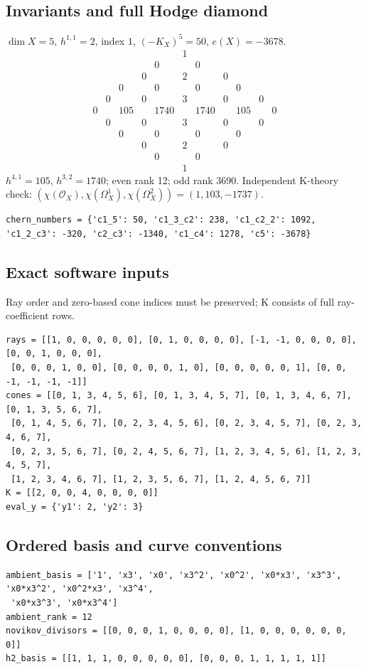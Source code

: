 \documentclass[10pt,a4paper]{article}
\begin{document}
\subsection*{Invariants and full Hodge diamond}
$\dim X=5$, $h^{1,1}=2$, index $1$, $(-K_X)^5=50$, $e(X)=-3678$.
\[\begin{array}{ccccccccccc}&&&&&1&&&&&\\&&&&0&&0&&&&\\&&&0&&2&&0&&&\\&&0&&0&&0&&0&&\\&0&&0&&3&&0&&0&\\0&&105&&1740&&1740&&105&&0\\&0&&0&&3&&0&&0&\\&&0&&0&&0&&0&&\\&&&0&&2&&0&&&\\&&&&0&&0&&&&\\&&&&&1&&&&&\end{array}\]
$h^{4,1}=105$, $h^{3,2}=1740$; even rank 12; odd rank 3690.
Independent K-theory check: $(\chi(\mathcal O_X),\chi(\Omega_X^1),\chi(\Omega_X^2))=(1, 103, -1737)$.
\begin{lstlisting}
chern_numbers = {'c1_5': 50, 'c1_3_c2': 238, 'c1_c2_2': 1092, 'c1_2_c3': -320, 'c2_c3': -1340, 'c1_c4': 1278, 'c5': -3678}
\end{lstlisting}
\subsection*{Exact software inputs}
Ray order and zero-based cone indices must be preserved; K consists of full ray-coefficient rows.
\begin{lstlisting}
rays = [[1, 0, 0, 0, 0, 0], [0, 1, 0, 0, 0, 0], [-1, -1, 0, 0, 0, 0], [0, 0, 1, 0, 0, 0],
 [0, 0, 0, 1, 0, 0], [0, 0, 0, 0, 1, 0], [0, 0, 0, 0, 0, 1], [0, 0, -1, -1, -1, -1]]
cones = [[0, 1, 3, 4, 5, 6], [0, 1, 3, 4, 5, 7], [0, 1, 3, 4, 6, 7], [0, 1, 3, 5, 6, 7],
 [0, 1, 4, 5, 6, 7], [0, 2, 3, 4, 5, 6], [0, 2, 3, 4, 5, 7], [0, 2, 3, 4, 6, 7],
 [0, 2, 3, 5, 6, 7], [0, 2, 4, 5, 6, 7], [1, 2, 3, 4, 5, 6], [1, 2, 3, 4, 5, 7],
 [1, 2, 3, 4, 6, 7], [1, 2, 3, 5, 6, 7], [1, 2, 4, 5, 6, 7]]
K = [[2, 0, 0, 4, 0, 0, 0, 0]]
eval_y = {'y1': 2, 'y2': 3}
\end{lstlisting}
\subsection*{Ordered basis and curve conventions}
\begin{lstlisting}
ambient_basis = ['1', 'x3', 'x0', 'x3^2', 'x0^2', 'x0*x3', 'x3^3', 'x0*x3^2', 'x0^2*x3', 'x3^4',
 'x0*x3^3', 'x0*x3^4']
ambient_rank = 12
novikov_divisors = [[0, 0, 0, 1, 0, 0, 0, 0], [1, 0, 0, 0, 0, 0, 0, 0]]
h2_basis = [[1, 1, 1, 0, 0, 0, 0, 0], [0, 0, 0, 1, 1, 1, 1, 1]]
\end{lstlisting}
\end{document}
